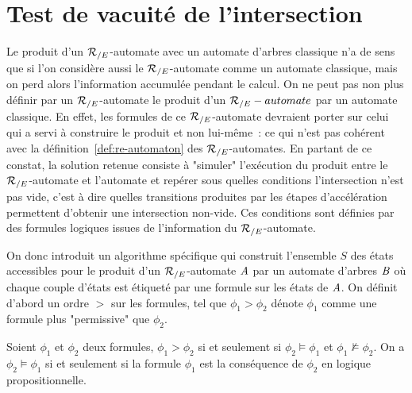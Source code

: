 \section{Test de vacuité de l'intersection}
\label{intersection:sec}
Le produit d'un ${\mathcal R_{/E}}$-automate avec un automate d'arbres classique n'a de sens que si l'on considère
aussi le ${\mathcal R_{/E}}$-automate comme un automate classique, mais on perd alors l'information accumulée pendant
le calcul. On ne peut pas non plus définir par un ${\mathcal R_{/E}}$-automate le produit d'un ${\mathcal R_{/E}}-automate$ par un automate
classique. En effet, les formules de ce ${\mathcal R_{/E}}$-automate devraient porter sur celui qui a servi à construire le produit
et non lui-même~: ce qui n'est pas cohérent avec la définition~\ref{def:re-automaton} des ${\mathcal R_{/E}}$-automates. 
En partant de ce constat, la solution retenue consiste à "simuler" l'exécution du produit
entre le ${\mathcal R_{/E}}$-automate et l'automate et repérer sous quelles conditions l'intersection n'est pas vide,
c'est à dire quelles transitions produites par les étapes d'accélération permettent d'obtenir une intersection
non-vide. Ces conditions sont définies par des formules logiques issues de l'information du ${\mathcal R_{/E}}$-automate.

On donc introduit un algorithme spécifique qui construit l'ensemble $S$ des états accessibles pour le 
produit d'un ${\mathcal R_{/E}}$-automate $\mathit A$ par un automate d'arbres $\mathit B$  où chaque couple d'états est étiqueté
par une formule sur les états de $\mathit A$. On définit d'abord un ordre $>$ sur les formules, tel
que $\phi_1 > \phi_2$ dénote $\phi_1$ comme une formule plus "permissive" que $\phi_2$.

\begin{definition}
Soient $\phi_1$ et $\phi_2$ deux formules, $\phi_1 > \phi_2$ si et seulement si $\phi_2 \models \phi_1$
et $\phi_1 \not \models \phi_2$. On a $\phi_2 \models \phi_1$ si et seulement si la formule $\phi_1$
est la conséquence de $\phi_2$ en logique propositionnelle.
\end{definition}



